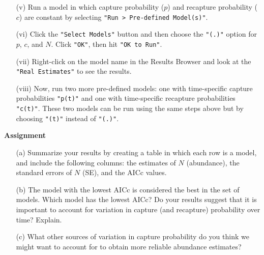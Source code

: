 \documentclass[12pt]{article}
\begin{document}
\begin{enumerate}
  \item[(v)] Run a model in which capture probability ($p$) and
    recapture probability ($c$) are constant by selecting
    \verb+"Run > Pre-defined Model(s)"+.
  \item[(vi)] Click the \verb+"Select Models"+ button and then choose the
    \verb+"(.)"+ option for $p$, $c$, and $N$. Click \verb+"OK"+, then
    hit \verb+"OK to Run"+.
  \item[(vii)] Right-click on the model name in the Results Browser
    and look at the \verb+"Real Estimates"+ to see the results.
  \item[(viii)]	Now, run two more pre-defined models: one with
    time-specific capture probabilities \verb+"p(t)"+ and one with
    time-specific recapture probabilities \verb+"c(t)"+. These two models can
    be run using the same steps above but by choosing \verb+"(t)"+ instead
    of \verb+"(.)"+.
\end{enumerate}

\clearpage

{\bf Assignment}

\begin{enumerate}
  \item[(a)] Summarize your results by creating a table in which each row
    is a model, and include the following columns: the estimates of $N$
    (abundance), the standard errors of $N$ (SE), and the AICc values.
  \item[(b)] The model with the lowest AICc is considered the best in
    the set of models. Which model has the lowest AICc? Do your
    results suggest that it is important to account for variation in
    capture (and recapture) probability over time? Explain.
  \item[(c)] What other sources of variation in capture probability do
    you think we might want to account for to obtain more reliable
    abundance estimates?
\end{enumerate}
\end{document}
